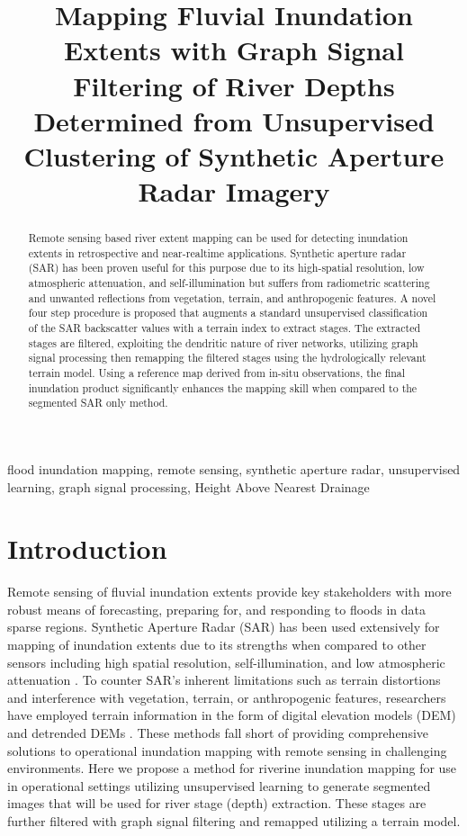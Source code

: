 \documentclass{article}
\title{Mapping Fluvial Inundation Extents with Graph Signal Filtering of River Depths Determined from Unsupervised Clustering of Synthetic Aperture Radar Imagery}
\begin{document}
\topmargin=0mm
%
\maketitle
%
\begin{abstract}
Remote sensing based river extent mapping can be used for detecting inundation extents in retrospective and near-realtime applications.
Synthetic aperture radar (SAR) has been proven useful for this purpose due to its high-spatial resolution, low atmospheric attenuation, and self-illumination but suffers from radiometric scattering and unwanted reflections from vegetation, terrain, and anthropogenic features. 
A novel four step procedure is proposed that augments a standard unsupervised classification of the SAR backscatter values with a terrain index to extract stages. 
The extracted stages are filtered, exploiting the dendritic nature of river networks, utilizing graph signal processing then remapping the filtered stages using the hydrologically relevant terrain model. 
Using a reference map derived from in-situ observations, the final inundation product significantly enhances the mapping skill when compared to the segmented SAR only method.
\end{abstract}
%
\begin{keywords}
flood inundation mapping, remote sensing, synthetic aperture radar, unsupervised learning, graph signal processing, Height Above Nearest Drainage
\end{keywords}
%
\section{Introduction}
\label{sec:intro}
%
Remote sensing of fluvial inundation extents provide key stakeholders with more robust means of forecasting, preparing for, and responding to floods in data sparse regions.
Synthetic Aperture Radar (SAR) has been used extensively for mapping of inundation extents \cite{aristizabal2020high,shastry2019using,landuyt2018flood,giustarini2016probabilistic,mason2012near,hess1995delineation,santoro2013multi,saatchi2019sar} due to its strengths when compared to other sensors including high spatial resolution, self-illumination, and low atmospheric attenuation \cite{saatchi2019sar}.
To counter SAR's inherent limitations such as terrain distortions and interference with vegetation, terrain, or anthropogenic features, researchers have employed terrain information in the form of digital elevation models (DEM) and detrended DEMs \cite{aristizabal2020high,shastry2019using,saatchi2019sar,twele2016sentinel,huang2017comparison}.
These methods fall short of providing comprehensive solutions to operational inundation mapping with remote sensing in challenging environments.
Here we propose a method for riverine inundation mapping for use in operational settings utilizing unsupervised learning to generate segmented images that will be used for river stage (depth) extraction. 
These stages are further filtered with graph signal filtering and remapped utilizing a terrain model.
%
\end{document}
